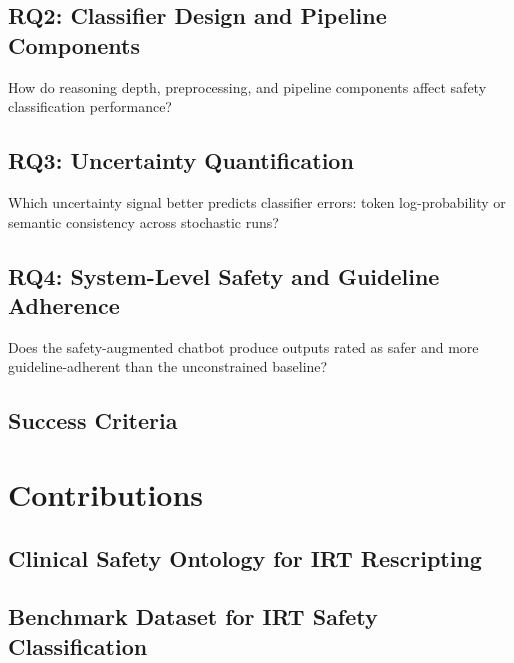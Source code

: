\subsection{RQ2: Classifier Design and Pipeline Components}

How do reasoning depth, preprocessing, and pipeline components affect safety classification performance?

\subsection{RQ3: Uncertainty Quantification}

Which uncertainty signal better predicts classifier errors: token log-probability or semantic consistency across stochastic runs?

\subsection{RQ4: System-Level Safety and Guideline Adherence}

Does the safety-augmented chatbot produce outputs rated as safer and more guideline-adherent than the unconstrained baseline?

\subsection{Success Criteria}


\section{Contributions}


\subsection{Clinical Safety Ontology for IRT Rescripting}


\subsection{Benchmark Dataset for IRT Safety Classification}

